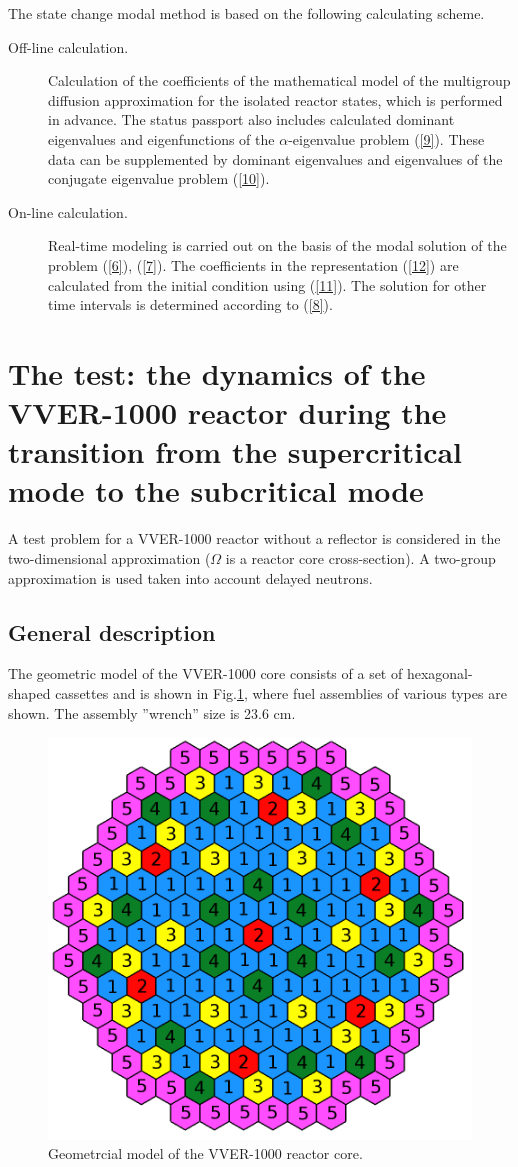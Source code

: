 \documentclass[a4paper]{jpconf}
\begin{document}
The state change modal method is based on the following calculating scheme.
\begin{description}
 \item[Off-line calculation.] Calculation of the coefficients of the mathematical model of the multigroup diffusion approximation for the isolated reactor states, which is performed in advance. The status passport also includes calculated dominant eigenvalues and eigenfunctions of the  $\alpha$-eigenvalue problem (\ref{9}). 
These data can be supplemented by dominant eigenvalues and eigenvalues of the conjugate eigenvalue problem (\ref{10}).
 \item[On-line calculation.] Real-time modeling is carried out on the basis of the modal solution of the problem  (\ref{6}), (\ref{7}).
The coefficients in the representation  (\ref{12}) are calculated from the initial condition using (\ref{11}). The solution for other time intervals is determined according to (\ref{8}).
\end{description}  

\section{The test: the dynamics of the VVER-1000 reactor during the transition from the supercritical mode to the subcritical mode} 

A test problem for a VVER-1000 reactor without a reflector  \cite{chao} 
is considered in the two-dimensional approximation ($\Omega$ is a reactor core cross-section). A two-group approximation is used taken into account delayed neutrons. 

\subsection{General description} 

The geometric model of the VVER-1000 core consists of a set of hexagonal-shaped cassettes and is shown in Fig.\ref{fig:2}, where fuel assemblies of various types are shown. The assembly ''wrench''  size is 23.6 cm.

\begin{figure}[h]
  \begin{center}
    \includegraphics[width=0.5\linewidth] {2.png}
	\caption{Geometrcial model of the VVER-1000 reactor core.}
	\label{fig:2}
  \end{center}
\end{figure} 
\end{document}
